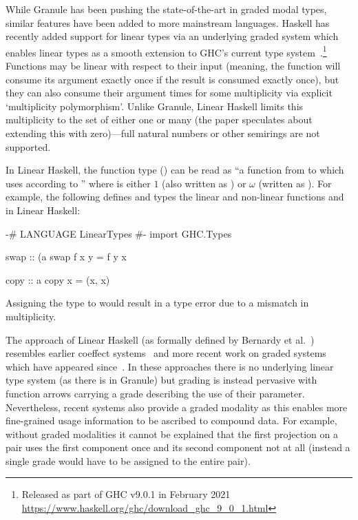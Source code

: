 

While Granule has been pushing the state-of-the-art in graded modal types,
similar features have been added to more mainstream languages. Haskell has
recently added support for linear types via an underlying
graded system which enables linear types as a smooth extension
to GHC's current type system~\cite{linear-haskell}.\footnote{Released
as part of GHC v9.0.1 in February 2021 \url{https://www.haskell.org/ghc/download_ghc_9_0_1.html}}
Functions may be linear with respect to
their input (meaning, the function will consume its argument exactly
once if the result is consumed exactly once), but
they can also consume their argument 
times for some multiplicity  via explicit `multiplicity polymorphism'.
Unlike Granule, Linear Haskell limits this multiplicity to the set of either
one or many (the paper speculates about extending this with zero)---full natural
numbers or other semirings are not supported.

In Linear Haskell, the function type ()
can be read as ``a function from 
to  which uses  according to '' where
 is either $1$ (also written as ) or $\omega$
(written as ).
For example, the following defines and types the linear and non-linear functions
 and  in Linear Haskell:
%
\begin{haskell}
{-# LANGUAGE LinearTypes #-}
import GHC.Types

swap :: (a %
swap f x y = f y x

copy :: a %
copy x = (x, x)
\end{haskell}
%
Assigning the type  to
 would result in a type error due to a mismatch in
multiplicity.

The approach of Linear Haskell (as formally defined by Bernardy et al.~\cite{linear-haskell})
resembles earlier coeffect
systems~\cite{ghica2014bounded,petricek2014coeffects} and
more recent work on graded systems which have appeared
since~\cite{abel-barnardy-icfp2020,choudhury2021}. In
these approaches there is no underlying linear type system (as there is in Granule) but
grading is instead pervasive with function arrows carrying a grade
describing the use of their parameter. Nevertheless, recent systems also provide a graded modality
as this enables more fine-grained usage information to be ascribed to compound data.
For example, without graded modalities it cannot be explained that the first projection on
a pair uses the first component once and its second component not at
all (instead a single grade would have to be assigned to the entire pair).

